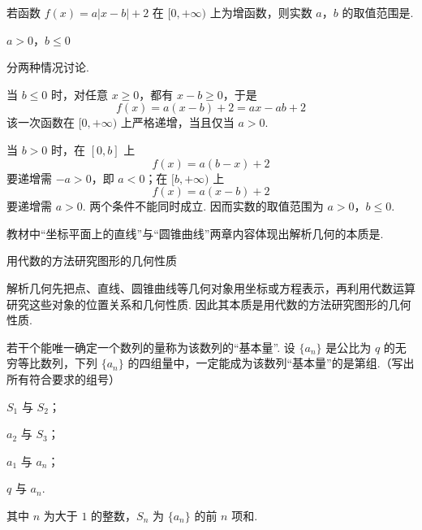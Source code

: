 \begin{problem}
若函数 \(f(x) = a\left|x - b\right| + 2\) 在 \([0, +\infty)\) 上为增函数，则实数 \(a\)，\(b\) 的取值范围是\fillinblank{}.
\end{problem}

\begin{answer}
\(a>0\)，\(b\leqslant 0\)
\end{answer}

\begin{solution}
分两种情况讨论.

当 \(b\leqslant0\) 时，对任意 \(x\geqslant0\)，都有 \(x-b\geqslant0\)，于是
\[
f(x)=a(x-b)+2=ax-ab+2
\]
该一次函数在 \([0,+\infty)\) 上严格递增，当且仅当 \(a>0\).

当 \(b>0\) 时，在 \([0,b]\) 上
\[
f(x)=a(b-x)+2
\]要递增需 \(-a>0\)，即 \(a<0\)；在 \([b,+\infty)\) 上
\[
f(x)=a(x-b)+2
\]
要递增需 \(a>0\). 两个条件不能同时成立. 因而实数的取值范围为 \(a>0\)，\(b\leqslant0\).
\end{solution}

\begin{problem}
教材中“坐标平面上的直线”与“圆锥曲线”两章内容体现出解析几何的本质是\fillinblank{}.
\end{problem}

\begin{answer}
用代数的方法研究图形的几何性质
\end{answer}

\begin{solution}
解析几何先把点、直线、圆锥曲线等几何对象用坐标或方程表示，再利用代数运算研究这些对象的位置关系和几何性质. 因此其本质是用代数的方法研究图形的几何性质.
\end{solution}

\begin{problem}
若干个能唯一确定一个数列的量称为该数列的“基本量”. 设 \(\{a_n\}\) 是公比为 \(q\) 的无穷等比数列，下列 \(\{a_n\}\) 的四组量中，一定能成为该数列“基本量”的是第\fillinblank{}组.（写出所有符合要求的组号）

\begin{circlelist}
\item \(S_{1}\) 与 \(S_{2}\)；
\item \(a_{2}\) 与 \(S_{3}\)；
\item \(a_{1}\) 与 \(a_{n}\)；
\item \(q\) 与 \(a_{n}\).
\end{circlelist}

其中 \(n\) 为大于 \(1\) 的整数，\(S_{n}\) 为 \(\{a_{n}\}\) 的前 \(n\) 项和.
\end{problem}


